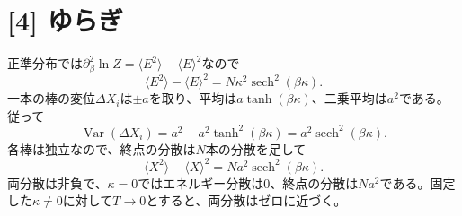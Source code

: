 \documentclass[11pt,a4paper]{article}
\begin{document}
\section*{[4] ゆらぎ}
正準分布では$\partial_\beta^2\ln Z=\langle E^2\rangle-\langle E\rangle^2$なので
\begin{equation}
 \boxed{\langle E^2\rangle-\langle E\rangle^2
 =N\kappa^2\operatorname{sech}^2(\beta\kappa)}.
\end{equation}
一本の棒の変位$\Delta X_i$は$\pm a$を取り、平均は$a\tanh(\beta\kappa)$、二乗平均は$a^2$である。従って
\begin{equation}
 \operatorname{Var}(\Delta X_i)
 =a^2-a^2\tanh^2(\beta\kappa)
 =a^2\operatorname{sech}^2(\beta\kappa).
\end{equation}
各棒は独立なので、終点の分散は$N$本の分散を足して
\begin{equation}
 \boxed{\langle X^2\rangle-\langle X\rangle^2
 =Na^2\operatorname{sech}^2(\beta\kappa)}.
\end{equation}
両分散は非負で、$\kappa=0$ではエネルギー分散は0、終点の分散は$Na^2$である。固定した$\kappa\ne0$に対して$T\to0$とすると、両分散はゼロに近づく。
\end{document}
